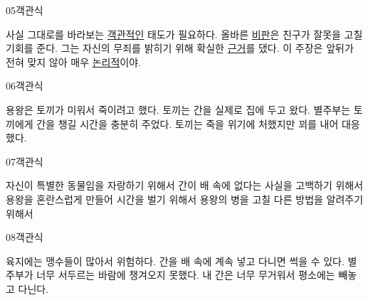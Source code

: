 \documentclass[fs95,seriesFre]{korfarm-base}
\begin{document}
\begin{kfQBlock}{05}{객관식}
\begin{kfChoices}
\kfChoice 사실 그대로를 바라보는 \uline{객관적인} 태도가 필요하다.
\kfChoice 올바른 \uline{비판}은 친구가 잘못을 고칠 기회를 준다.
\kfChoice 그는 자신의 무죄를 밝히기 위해 확실한 \uline{근거}를 댔다.
\kfChoice 이 주장은 앞뒤가 전혀 맞지 않아 매우 \uline{논리적}이야.
\end{kfChoices}
\end{kfQBlock}

\begin{kfQBlock}{06}{객관식}
\begin{kfChoices}
\kfChoice 용왕은 토끼가 미워서 죽이려고 했다.
\kfChoice 토끼는 간을 실제로 집에 두고 왔다.
\kfChoice 별주부는 토끼에게 간을 챙길 시간을 충분히 주었다.
\kfChoice 토끼는 죽을 위기에 처했지만 꾀를 내어 대응했다.
\end{kfChoices}
\end{kfQBlock}

\begin{kfQBlock}{07}{객관식}
\begin{kfChoices}
\kfChoice 자신이 특별한 동물임을 자랑하기 위해서
\kfChoice 간이 배 속에 없다는 사실을 고백하기 위해서
\kfChoice 용왕을 혼란스럽게 만들어 시간을 벌기 위해서
\kfChoice 용왕의 병을 고칠 다른 방법을 알려주기 위해서
\end{kfChoices}
\end{kfQBlock}

\begin{kfQBlock}{08}{객관식}
\begin{kfChoices}
\kfChoice 육지에는 맹수들이 많아서 위험하다.
\kfChoice 간을 배 속에 계속 넣고 다니면 썩을 수 있다.
\kfChoice 별주부가 너무 서두르는 바람에 챙겨오지 못했다.
\kfChoice 내 간은 너무 무거워서 평소에는 빼놓고 다닌다.
\end{kfChoices}
\end{kfQBlock}
\end{document}
